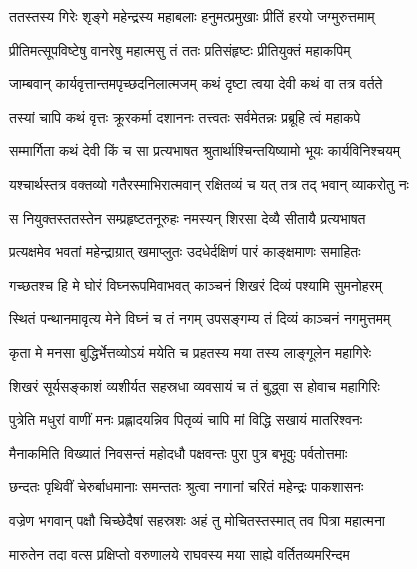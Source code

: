 
\twolineshloka
{ततस्तस्य गिरेः शृङ्गे महेन्द्रस्य महाबलाः}
{हनुमत्प्रमुखाः प्रीतिं हरयो जग्मुरुत्तमाम्} %

\twolineshloka
{प्रीतिमत्सूपविष्टेषु वानरेषु महात्मसु}
{तं ततः प्रतिसंहृष्टः प्रीतियुक्तं महाकपिम्} %

\twolineshloka
{जाम्बवान् कार्यवृत्तान्तमपृच्छदनिलात्मजम्}
{कथं दृष्टा त्वया देवी कथं वा तत्र वर्तते} %

\twolineshloka
{तस्यां चापि कथं वृत्तः क्रूरकर्मा दशाननः}
{तत्त्वतः सर्वमेतन्नः प्रब्रूहि त्वं महाकपे} %

\twolineshloka
{सम्मार्गिता कथं देवी किं च सा प्रत्यभाषत}
{श्रुतार्थाश्चिन्तयिष्यामो भूयः कार्यविनिश्चयम्} %

\twolineshloka
{यश्चार्थस्तत्र वक्तव्यो गतैरस्माभिरात्मवान्}
{रक्षितव्यं च यत् तत्र तद् भवान् व्याकरोतु नः} %

\twolineshloka
{स नियुक्तस्ततस्तेन सम्प्रहृष्टतनूरुहः}
{नमस्यन् शिरसा देव्यै सीतायै प्रत्यभाषत} %

\twolineshloka
{प्रत्यक्षमेव भवतां महेन्द्राग्रात् खमाप्लुतः}
{उदधेर्दक्षिणं पारं काङ्क्षमाणः समाहितः} %

\twolineshloka
{गच्छतश्च हि मे घोरं विघ्नरूपमिवाभवत्}
{काञ्चनं शिखरं दिव्यं पश्यामि सुमनोहरम्} %

\twolineshloka
{स्थितं पन्थानमावृत्य मेने विघ्नं च तं नगम्}
{उपसङ्गम्य तं दिव्यं काञ्चनं नगमुत्तमम्} %

\twolineshloka
{कृता मे मनसा बुद्धिर्भेत्तव्योऽयं मयेति च}
{प्रहतस्य मया तस्य लाङ्गूलेन महागिरेः} %

\twolineshloka
{शिखरं सूर्यसङ्काशं व्यशीर्यत सहस्रधा}
{व्यवसायं च तं बुद्ध्वा स होवाच महागिरिः} %

\twolineshloka
{पुत्रेति मधुरां वाणीं मनः प्रह्लादयन्निव}
{पितृव्यं चापि मां विद्धि सखायं मातरिश्वनः} %

\twolineshloka
{मैनाकमिति विख्यातं निवसन्तं महोदधौ}
{पक्षवन्तः पुरा पुत्र बभूवुः पर्वतोत्तमाः} %

\twolineshloka
{छन्दतः पृथिवीं चेरुर्बाधमानाः समन्ततः}
{श्रुत्वा नगानां चरितं महेन्द्रः पाकशासनः} %

\twolineshloka
{वज्रेण भगवान् पक्षौ चिच्छेदैषां सहस्रशः}
{अहं तु मोचितस्तस्मात् तव पित्रा महात्मना} %

\twolineshloka
{मारुतेन तदा वत्स प्रक्षिप्तो वरुणालये}
{राघवस्य मया साह्ये वर्तितव्यमरिन्दम} %

